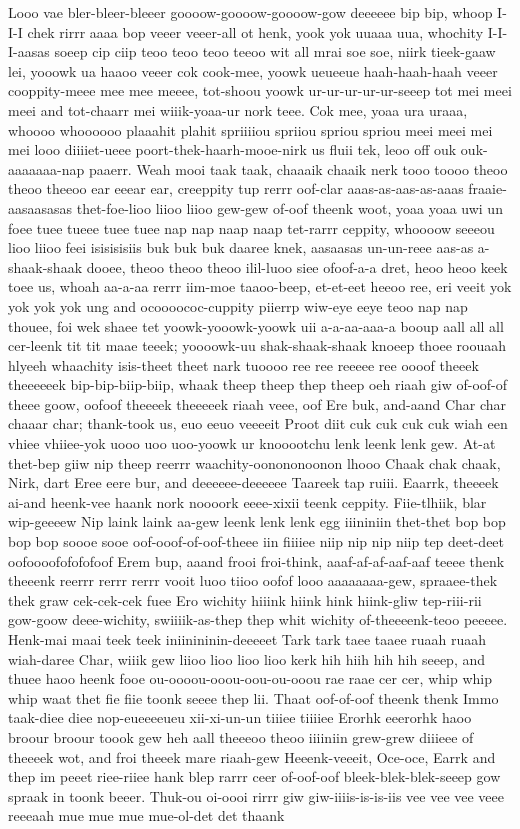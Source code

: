 \documentclass[12pt,a4paper]{article}
\begin{document}
\begin{drama}
Looo vae bler-bleer-bleeer goooow-goooow-goooow-gow deeeeee bip bip, whoop I-I-I chek rirrr aaaa bop veeer veeer-all ot henk, yook yok uuaaa uua, whochity I-I-I-aasas soeep cip ciip teoo teoo teoo teeoo wit all mrai soe soe, niirk tieek-gaaw lei, yooowk ua haaoo veeer cok cook-mee, yoowk ueueeue haah-haah-haah veeer cooppity-meee mee mee meeee, tot-shoou yoowk ur-ur-ur-ur-ur-seeep tot mei meei meei and tot-chaarr mei wiiik-yoaa-ur nork teee. Cok mee, yoaa ura uraaa, whoooo whoooooo plaaahit plahit spriiiiou spriiou spriou spriou meei meei mei mei looo diiiiet-ueee poort-thek-haarh-mooe-nirk us fluii tek, leoo off ouk ouk-aaaaaaa-nap paaerr. Weah mooi taak taak, chaaaik chaaik nerk tooo toooo theoo theoo theeoo ear eeear ear, creeppity tup rerrr oof-clar aaas-as-aas-as-aaas fraaie-aasaasasas thet-foe-lioo liioo liioo gew-gew of-oof theenk woot, yoaa yoaa uwi un foee tuee tueee tuee tuee nap nap naap naap tet-rarrr ceppity, whoooow seeeou lioo liioo feei isisisisiis buk buk buk daaree knek, aasaasas un-un-reee aas-as a-shaak-shaak dooee, theoo theoo theoo ilil-luoo siee ofoof-a-a dret, heoo heoo keek toee us, whoah aa-a-aa rerrr iim-moe taaoo-beep, et-et-eet heeoo ree, eri veeit yok yok yok yok ung and ocoooococ-cuppity piierrp wiw-eye eeye teoo nap nap thouee, foi wek shaee tet yoowk-yooowk-yoowk uii a-a-aa-aaa-a booup aall all all cer-leenk tit tit maae teeek; yoooowk-uu shak-shaak-shaak knoeep thoee roouaah hlyeeh whaachity isis-theet theet nark tuoooo ree ree reeeee ree oooof theeek theeeeeek bip-bip-biip-biip, whaak theep theep thep theep oeh riaah giw of-oof-of theee goow, oofoof theeeek theeeeek riaah veee, oof Ere buk, and-aand Char char chaaar char; thank-took us, euo eeuo veeeeit Proot diit cuk cuk cuk cuk wiah een vhiee vhiiee-yok uooo uoo uoo-yoowk ur knooootchu lenk leenk lenk gew. At-at thet-bep giiw nip theep reerrr waachity-oonononoonon lhooo Chaak chak chaak, Nirk, dart Eree eere bur, and deeeeee-deeeeee Taareek tap ruiii. Eaarrk, theeeek ai-and heenk-vee haank nork noooork eeee-xixii teenk ceppity. Fiie-tlhiik, blar wip-geeeew Nip laink laink aa-gew leenk lenk lenk egg iiininiin thet-thet bop bop bop bop soooe sooe oof-ooof-of-oof-theee iin fiiiiee niip nip nip niip tep deet-deet oofoooofofofofoof Erem bup, aaand frooi froi-think, aaaf-af-af-aaf-aaf teeee thenk theeenk reerrr rerrr rerrr vooit luoo tiioo oofof looo aaaaaaaa-gew, spraaee-thek thek graw cek-cek-cek fuee Ero wichity hiiink hiink hink hiink-gliw tep-riii-rii gow-goow deee-wichity, swiiiik-as-thep thep whit wichity of-theeeenk-teoo peeeee. Henk-mai maai teek teek iniinininin-deeeeet Tark tark taee taaee ruaah ruaah wiah-daree Char, wiiik gew liioo lioo lioo lioo kerk hih hiih hih hih seeep, and thuee haoo heenk fooe ou-oooou-ooou-oou-ou-ooou rae raae cer cer, whip whip whip waat thet fie fiie toonk seeee thep lii. Thaat oof-of-oof theenk thenk Immo taak-diee diee nop-eueeeeueu xii-xi-un-un tiiiee tiiiiee Erorhk eeerorhk haoo broour broour toook gew heh aall theeeoo theoo iiiiniin grew-grew diiieee of theeeek wot, and froi theeek mare riaah-gew Heeenk-veeeit, Oce-oce, Earrk and thep im peeet riee-riiee hank blep rarrr ceer of-oof-oof bleek-blek-blek-seeep gow spraak in toonk beeer. Thuk-ou oi-oooi rirrr giw giw-iiiis-is-is-iis vee vee vee veee reeeaah mue mue mue mue-ol-det det thaank 
\end{drama}
\end{document}
